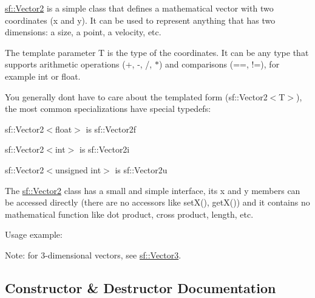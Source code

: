 \begin{DoxyVerb}\end{DoxyVerb}


\mbox{\hyperlink{classsf_1_1_vector2}{sf\+::\+Vector2}} is a simple class that defines a mathematical vector with two coordinates (x and y). It can be used to represent anything that has two dimensions\+: a size, a point, a velocity, etc.

The template parameter T is the type of the coordinates. It can be any type that supports arithmetic operations (+, -\/, /, $\ast$) and comparisons (==, !=), for example int or float.

You generally don\textquotesingle{}t have to care about the templated form (sf\+::\+Vector2$<$\+T$>$), the most common specializations have special typedefs\+: \begin{DoxyItemize}
\item sf\+::\+Vector2$<$float$>$ is sf\+::\+Vector2f \item sf\+::\+Vector2$<$int$>$ is sf\+::\+Vector2i \item sf\+::\+Vector2$<$unsigned int$>$ is sf\+::\+Vector2u\end{DoxyItemize}
The \mbox{\hyperlink{classsf_1_1_vector2}{sf\+::\+Vector2}} class has a small and simple interface, its x and y members can be accessed directly (there are no accessors like set\+X(), get\+X()) and it contains no mathematical function like dot product, cross product, length, etc.

Usage example\+: 
\begin{DoxyCode}{0}
\DoxyCodeLine{}
\DoxyCodeLine{}
\end{DoxyCode}


Note\+: for 3-\/dimensional vectors, see \mbox{\hyperlink{classsf_1_1_vector3}{sf\+::\+Vector3}}. \begin{DoxyVerb}\end{DoxyVerb}
 

\subsection{Constructor \& Destructor Documentation}
\mbox{\label{classsf_1_1_vector2_a58c32383b5291380db4b43a289f75988}} 
